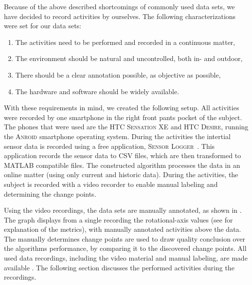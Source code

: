 Because of the above described shortcomings of commonly used data sets, we have decided to record activities by ourselves.
The following characterizations were set for our data sets:
\begin{enumerate}
  \item The activities need to be performed and recorded in a continuous matter,
  \item The environment should be natural and uncontrolled, both in- and outdoor,
  \item There should be a clear annotation possible, as objective as possible,
  \item The hardware and software should be widely available.
\end{enumerate}

With these requirements in mind, we created the following setup.
All activities were recorded by one smartphone in the right front pants pocket of the subject.
The phones that were used are the \textsc{HTC Sensation XE} and \textsc{HTC Desire}, running the \textsc{Anroid} smartphone operating system.
During the activities the intertial sensor data is recorded using a free application, \textsc{Sensor Logger}~\cite{sensorlogger}.
This application records the sensor data to \textsc{CSV} files, which are then transformed to \textsc{MATLAB} compatible files.
The constructed algorithm processes the data in an online matter (using only current and historic data).
During the activities, the subject is recorded with a video recorder to enable manual labeling and determining the change points.

Using the video recordings, the data sets are manually annotated, as shown in .
The graph displays from a single recording the rotational-axis values (see  for explanation of the metrics), with manually annotated activities above the data.
The manually determines change points are used to draw quality conclusion over the algorithms performance, by comparing it to the discovered change points.
All used data recordings, including the video material and manual labeling, are made available \cite{vlasveld2013continuous}.
The following section discusses the performed activities during the recordings.
